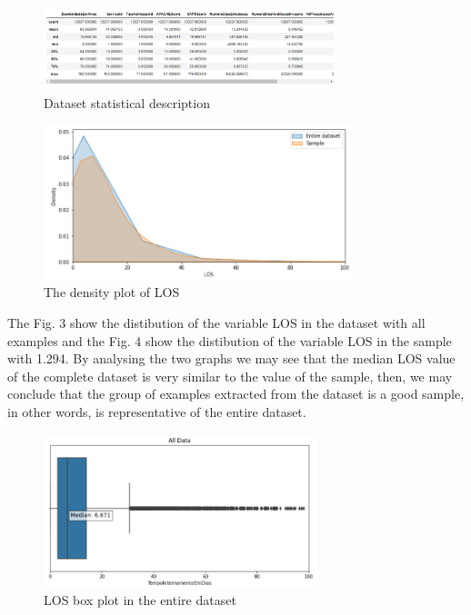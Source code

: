\documentclass[journal]{IEEEtran} %
\begin{document}
\begin{figure}[htp]
    \centering
    \includegraphics[width=8.5cm]{Project1-Report_FAA/dataset_desc.png}
    \caption{Dataset statistical description}
    \label{fig: adfgrg}
\end{figure}

\begin{figure}[htp]
    \centering
    \includegraphics[width=9cm]{Project1-Report_FAA/density.png}
    \caption{The density plot of LOS}
    \label{fig:galaxy}
\end{figure}


The Fig. 3 show the distibution of the variable LOS in the dataset with all examples and the Fig. 4 show the distibution of the variable LOS in the sample with 1.294. By analysing the two graphs we may see that the median LOS value of the complete dataset is very similar to the value of the sample, then, we may conclude that the group of examples extracted from the dataset is a good sample, in other words, is representative of the entire dataset.

\begin{figure}[htp]
    \centering
    \includegraphics[width=8cm]{Project1-Report_FAA/box_los.png}
    \caption{LOS box plot in the entire dataset}
    \label{fig:galaxy}
\end{figure}
\end{document}
